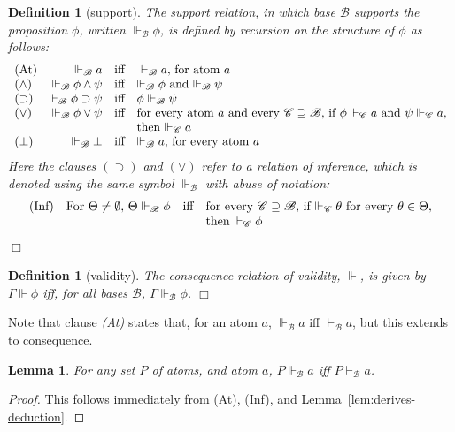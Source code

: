 \documentclass{sn-jnl}
\newcommand{\derives}[1]{\vdash_{\!#1}}
\newcommand{\base}[1]{\mathscr{#1}}
\renewcommand{\derives}[2]{\vdash_{\base{#1}}#2}
\newcommand{\support}[2]{\Vdash_{\base{#1}}#2}
\newtheorem{definition}[theorem]{Definition}
\newtheorem{lemma}[theorem]{Lemma}
\newcommand{\fillBox}{\hfill$\Box$}
\begin{document}
\begin{definition}[support]
\label{def:sandqvist-support}
    The support relation, in which base $\base{B}$ \emph{supports} the proposition $\phi$, written $\support{B}{\phi}$, is defined by recursion on the structure of $\phi$ as follows: 
    \[
    \begin{array}{lr@{\quad}c@{\quad}l}
    (\mbox{\rm At}) & \support{B}{a} & \mbox{iff} & \mbox{
    $\derives{B}{a}$, for atom $a$} \\ 
    (\wedge) & \support{B}{\phi\wedge\psi} & \mbox{iff} & 
    \mbox{$\support{B}{\phi}$ and $\support{B}{\psi}$} \\ 
    (\supset) & \support{B}{\phi\supset\psi} &  \mbox{iff} & 
    \phi \support{B}{\psi} \\ 
    (\vee) &  \support{B}{\phi\vee\psi} & \mbox{iff} & \mbox{for every atom $a$ and every $\base{C}\supseteq\base{B}$, if $\phi\support{C}{a}$ and $\psi\support{C}{a}$,} \\
    & & & \mbox{then $\support{C}{a}$} \\ 
    (\bot) & \support{B}{\bot} & \mbox{iff} & \mbox{$\support{B}{a}$, for every atom $a$}
    \end{array}
    \]
    Here the clauses $(\supset)$ and $(\vee)$ refer to a relation of inference, which is denoted using the same symbol $\support{\base{B}}{}$ with abuse of notation: 
    \[
    \begin{array}{lr@{\quad}c@{\quad}l}
    (\mbox{\rm Inf}) & \mbox{For $\Theta \neq \emptyset$, $\Theta\support{B}\phi$} & \mbox{iff} &  \mbox{for every $\base{C}\supseteq\base{B}$, if $\support{C}{\theta}$ for every $\theta\in\Theta$,} \\ 
    & & & \mbox{then $\support{C}\phi$}
    \end{array} 
    \] 
    \fillBox
\end{definition}

\smallskip 

\begin{definition}[validity] \label{def:validity} 
The consequence relation of \emph{validity}, $\Vdash$, is given by 
$\Gamma \Vdash \phi$ iff, for all bases $\mathcal{B}$, $\Gamma \Vdash_\mathcal{B} \phi$.  
\fillBox
\end{definition}

\smallskip 

Note that clause \emph{(At)} states that, for an atom $a$, $\support{B}{a}$ iff $\derives{B}{a}$, but this extends to consequence. 
\begin{lemma}\label{lem:support-eq-derives-atoms}
    For any set $P$ of atoms, and atom $a$, $P\support{B}{a}$ iff 
    $P\derives{B}{a}$. 
\end{lemma}
\begin{proof}
    This follows immediately from (At), (Inf), and Lemma~\ref{lem:derives-deduction}.
\end{proof}
\end{document}
